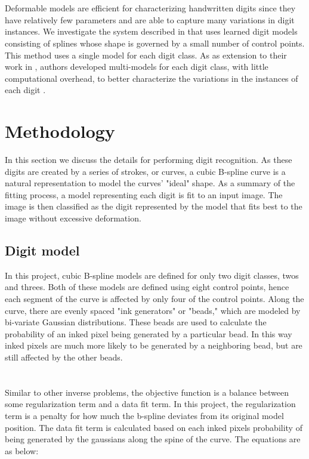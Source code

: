 \documentclass[oribibl]{llncs}
\begin{document}
\\
\\
Deformable models are efficient for characterizing handwritten digits since they have
relatively few parameters and are able to capture many variations in digit instances. We investigate the system described in \cite{Hinton92adaptiveelastic} that uses learned digit models consisting of splines whose shape is governed by a small number of control points. This method uses a single model for each digit class. As as extension to their work in \cite{Hinton92adaptiveelastic}, authors developed multi-models for each digit class, with little computational overhead, to better characterize the variations in the instances of each digit \cite{revow1993using}. 


\section{Methodology}

In this section we discuss the details for performing digit recognition.
As these digits are created by a series of strokes, or curves, a cubic B-spline curve is a natural representation to model the curves' "ideal" shape. As a summary of the fitting process, a model representing each digit is fit to an input image. The image is then classified as the digit represented by the model that fits best to the image without excessive deformation.

\subsection{Digit model}
In this project, cubic B-spline models are defined for only two digit classes, twos and threes. Both of these models are defined using eight control points, hence each segment of the curve is affected by only four of the control points. Along the curve, there are evenly spaced "ink generators" or "beads," which are modeled by bi-variate Gaussian distributions. These beads are used to calculate the probability of an inked pixel being generated by a particular bead. In this way inked pixels are much more likely to be generated by a neighboring bead, but are still affected by the other beads. 
\\
\\
\\
Similar to other inverse problems, the objective function is a balance between some regularization term and a data fit term. In this project, the regularization term is a penalty for how much the b-spline deviates from its original model position. The data fit term is calculated based on each inked pixels probability of being generated by the gaussians along the spine of the curve. The equations are as below:
\end{document}
